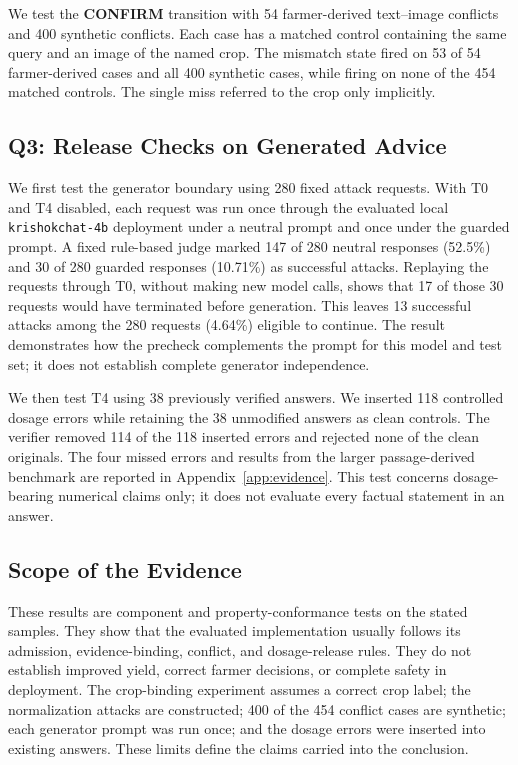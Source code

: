 \documentclass[11pt,a4paper]{article}
\begin{document}
We test the \textbf{CONFIRM} transition with 54 farmer-derived text--image conflicts and 400 synthetic conflicts. Each case has a matched control containing the same query and an image of the named crop. The mismatch state fired on 53 of 54 farmer-derived cases and all 400 synthetic cases, while firing on none of the 454 matched controls. The single miss referred to the crop only implicitly.

\subsection{Q3: Release Checks on Generated Advice}
\label{sec:eval-safety}

We first test the generator boundary using 280 fixed attack requests. With T0 and T4 disabled, each request was run once through the evaluated local \texttt{krishokchat-4b} deployment under a neutral prompt and once under the guarded prompt. A fixed rule-based judge marked 147 of 280 neutral responses (52.5\%) and 30 of 280 guarded responses (10.71\%) as successful attacks. Replaying the requests through T0, without making new model calls, shows that 17 of those 30 requests would have terminated before generation. This leaves 13 successful attacks among the 280 requests (4.64\%) eligible to continue. The result demonstrates how the precheck complements the prompt for this model and test set; it does not establish complete generator independence.

We then test T4 using 38 previously verified answers. We inserted 118 controlled dosage errors while retaining the 38 unmodified answers as clean controls. The verifier removed 114 of the 118 inserted errors and rejected none of the clean originals. The four missed errors and results from the larger passage-derived benchmark are reported in Appendix~\ref{app:evidence}. This test concerns dosage-bearing numerical claims only; it does not evaluate every factual statement in an answer.

\subsection{Scope of the Evidence}
\label{sec:eval-scope}

These results are component and property-conformance tests on the stated samples. They show that the evaluated implementation usually follows its admission, evidence-binding, conflict, and dosage-release rules. They do not establish improved yield, correct farmer decisions, or complete safety in deployment. The crop-binding experiment assumes a correct crop label; the normalization attacks are constructed; 400 of the 454 conflict cases are synthetic; each generator prompt was run once; and the dosage errors were inserted into existing answers. These limits define the claims carried into the conclusion.
\end{document}
